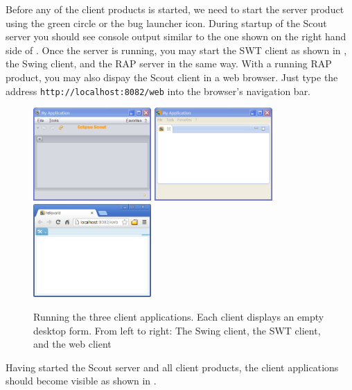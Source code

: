 \documentclass[a4paper,10pt,twoside]{book}
\begin{document}
Before any of the client products is started, we need to start the server product using the green circle or the bug launcher icon.
During startup of the Scout server you should see console output similar to the one shown on the right hand side of .
Once the server is running, you may start the SWT client as shown in , the Swing client, and the RAP server in the same way.
With a running RAP product, you may also dispay the Scout client in a web browser.
Just type the address \texttt{http://localhost:8082/web} into the browser's navigation bar.

\begin{figure}
\includegraphics[width=4.5cm]{hellworld_empty_swing.png} \hspace{3mm}
\includegraphics[width=4.5cm]{hellworld_empty_swt.png} \hspace{3mm}
\includegraphics[width=4.5cm]{hellworld_empty_rap.png}
\caption{Running the three client applications. 
Each client displays an empty desktop form. 
From left to right: The Swing client, the SWT client, and the web client}
\end{figure}

Having started the Scout server and all client products, the client applications should become visible as shown in .

\end{document}
